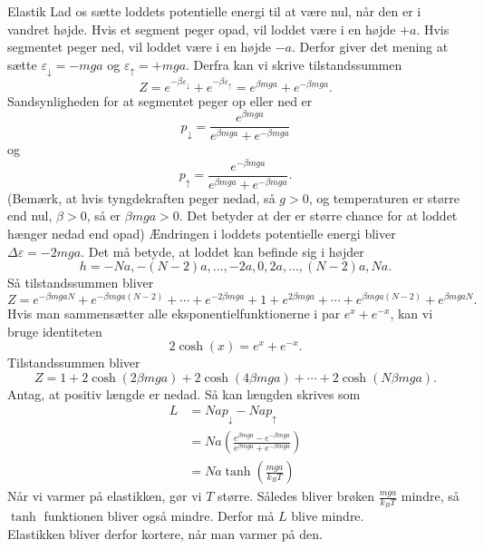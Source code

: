 \begin{opgave}{Elastik}
    \opg Lad os sætte loddets potentielle energi til at være nul, når den er i vandret højde. Hvis et segment peger opad, vil loddet være i en højde $+a$. Hvis segmentet peger ned, vil loddet være i en højde $-a$. Derfor giver det mening at sætte $\varepsilon_\downarrow=-mga$ og $\varepsilon_\uparrow=+mga$. Derfra kan vi skrive tilstandssummen
    \[ Z=e^{-\beta\varepsilon_\downarrow}+e^{-\beta\varepsilon_\uparrow}=e^{\beta mga}+e^{-\beta mga}. \]
    Sandsynligheden for at segmentet peger op eller ned er
    \[ p_\downarrow=\frac{e^{\beta mga}}{e^{\beta mga}+e^{-\beta mga}} \]
    og
    \[ p_\uparrow=\frac{e^{-\beta mga}}{e^{\beta mga}+e^{-\beta mga}}. \]
    (Bemærk, at hvis tyngdekraften peger nedad, så $g>0$, og temperaturen er større end nul, $\beta>0$, så er $\beta mga>0$. Det betyder at der er større chance for at loddet hænger nedad end opad)
    \opg Ændringen i loddets potentielle energi bliver $\Delta\varepsilon=-2mga$. Det må betyde, at loddet kan befinde sig i højder
    \[ h=-Na,-(N-2)a,\dots,-2a,0,2a,\dots,(N-2)a,Na. \]
    Så tilstandssummen bliver
    \[ Z=e^{-\beta mgaN}+e^{-\beta mga(N-2)}+\cdots+e^{-2\beta mga}+1+e^{2\beta mga}+\cdots+e^{\beta mga(N-2)}+e^{\beta mgaN}. \]
    Hvis man sammensætter alle eksponentielfunktionerne i par $e^{x}+e^{-x}$, kan vi bruge identiteten
    \[ 2\cosh(x)=e^{x}+e^{-x}. \]
    Tilstandssummen bliver
    \[ Z=1+2\cosh(2\beta mga)+2\cosh\left(4\beta mga\right)+\cdots +2\cosh\left(N\beta mga\right). \]
    \opg Antag, at positiv længde er nedad. Så kan længden skrives som
    \begin{align*}
        L&=Nap_\downarrow-Nap_\uparrow\\
        &=Na\left(\frac{e^{\beta mga}-e^{-\beta mga}}{e^{\beta mga}+e^{-\beta mga}}\right)\\
        &=Na\tanh\left(\frac{mga}{k_BT}\right)
    \end{align*}
    \opg Når vi varmer på elastikken, gør vi $T$ større. Således bliver brøken $\frac{mga}{k_BT}$ mindre, så $\tanh$ funktionen bliver også mindre. Derfor må $L$ blive mindre.\\
    Elastikken bliver derfor kortere, når man varmer på den.
\end{opgave}